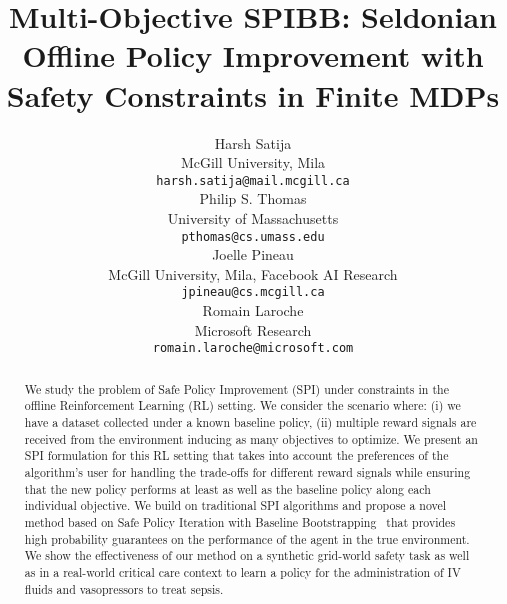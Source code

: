\documentclass{article}
\title{Multi-Objective SPIBB: Seldonian Offline Policy Improvement with Safety Constraints in Finite MDPs}
\author{%
  Harsh Satija\\
  McGill University, Mila \\
  \texttt{harsh.satija@mail.mcgill.ca} \\
   \And
  Philip S. Thomas \\ 
  University of Massachusetts \\ 
  \texttt{pthomas@cs.umass.edu} \\
   \AND
   Joelle Pineau \\
   McGill University, Mila, Facebook AI Research \\
   \texttt{jpineau@cs.mcgill.ca} \\
   \And
   Romain Laroche \\ 
   Microsoft Research \\
   \texttt{romain.laroche@microsoft.com}
}
\begin{document}
\maketitle



\begin{abstract}
We study the problem of Safe Policy Improvement (SPI) under constraints in the offline Reinforcement Learning (RL) setting. We consider the scenario where: (i) we have a dataset collected under a known baseline policy, (ii) multiple reward signals are received from the environment inducing as many objectives to optimize. 
We present an SPI formulation for this RL setting that takes into account the preferences of the algorithm's user for handling the trade-offs for different reward signals while ensuring that the new policy performs at least as well as the baseline policy along each individual objective. 
We build on traditional SPI algorithms and propose a novel method based on Safe Policy Iteration with Baseline Bootstrapping~\citep[SPIBB,][]{laroche2017safe} 
that provides high probability guarantees on the performance of the agent in the true environment.
We show the effectiveness of our method on a synthetic grid-world safety task as well as in a real-world critical care context to learn a policy for the administration of IV fluids and vasopressors to treat sepsis.

\end{abstract}








% 








\end{document}
